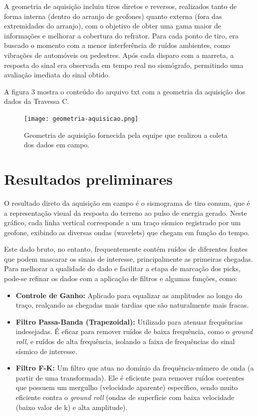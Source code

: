 \documentclass[a4paper,12pt]{article}
\begin{document}
A geometria de aquisição incluiu tiros diretos e reversos, realizados tanto de forma interna (dentro do arranjo de geofones) quanto externa (fora das extremidades do arranjo), com o objetivo de obter uma gama maior de informações e melhorar a cobertura do refrator. Para cada ponto de tiro, era buscado o momento com a menor interferência de ruídos ambientes, como vibrações de automóveis ou pedestres. Após cada disparo com a marreta, a resposta do sinal era observada em tempo real no sismógrafo, permitindo uma avaliação imediata do sinal obtido.

A figura 3 mostra o conteúdo do arquivo txt com a geometria da aquisição dos dados da Travessa C.

\begin{figure}[H]
    \centering
    \texttt{[image: geometria-aquisicao.png]}
    \caption{Geometria de aquisição fornecida pela equipe que realizou a coleta dos dados em campo.}
    \label{fig:placeholder}
\end{figure}




\section{Resultados preliminares}


O resultado direto da aquisição em campo é o sismograma de tiro comum, que é a representação visual da resposta do terreno ao pulso de energia gerado. Neste gráfico, cada linha vertical corresponde a um traço sísmico registrado por um geofone, exibindo as diversas ondas (wavelets) que chegam em função do tempo.

Este dado bruto, no entanto, frequentemente contém ruídos de diferentes fontes que podem mascarar os sinais de interesse, principalmente as primeiras chegadas. Para melhorar a qualidade do dado e facilitar a etapa de marcação dos picks, pode-se refinar os dados com a aplicação de filtros e algumas funções, como:

\begin{itemize}
    \item \textbf{Controle de Ganho:} Aplicado para equalizar as amplitudes ao longo do traço, realçando as chegadas mais tardias que são naturalmente mais fracas.

    \item \textbf{Filtro Passa-Banda (Trapezoidal):} Utilizado para atenuar frequências indesejadas. É eficaz para remover ruídos de baixa frequência, como o \textit{ground roll}, e ruídos de alta frequência, isolando a faixa de frequências do sinal sísmico de interesse.

    \item \textbf{Filtro F-K:} Um filtro que atua no domínio da frequência-número de onda (a partir de uma transformada). Ele é eficiente para remover ruídos coerentes que possuem um mergulho (velocidade aparente) específico, sendo muito eficiente contra o \textit{ground roll} (ondas de superfície com baixa velocidade (baixo valor de k) e alta amplitude).
\end{itemize}
\end{document}
